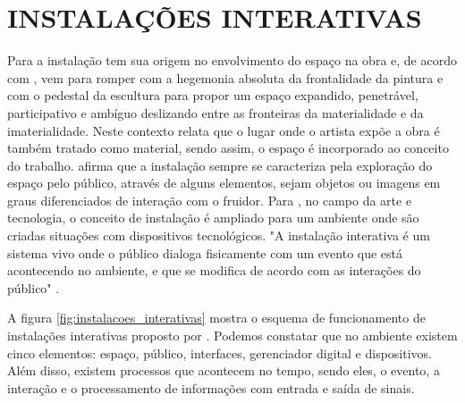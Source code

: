 \section{INSTALAÇÕES INTERATIVAS}
\label{sec:instalacoes_interativas}

Para  a instalação tem sua origem no envolvimento do espaço na obra e, de acordo com , vem para romper com a hegemonia absoluta da frontalidade da pintura e com o pedestal da escultura para propor um espaço expandido, penetrável, participativo e ambíguo deslizando entre as fronteiras da materialidade e da imaterialidade. Neste contexto  relata que o lugar onde o artista expõe a obra é também tratado como material, sendo assim, o espaço é incorporado ao conceito do trabalho.  afirma que a instalação sempre se caracteriza pela exploração do espaço pelo público, através de alguns elementos, sejam objetos ou imagens em graus diferenciados de interação com o fruidor. Para , no campo da arte e tecnologia, o conceito de instalação é ampliado para um ambiente onde são criadas situações com dispositivos tecnológicos. "A instalação interativa é um sistema vivo onde o público dialoga fisicamente com um evento que está acontecendo no ambiente, e que se modifica de acordo com as interações do público" \cite[p. 62]{sogabe2011}.


A figura \ref{fig:instalacoes_interativas} mostra o esquema de funcionamento de instalações interativas proposto por . Podemos constatar que no ambiente existem cinco elementos: espaço, público, interfaces, gerenciador digital e dispositivos. Além disso, existem processos que acontecem no tempo, sendo eles, o evento, a interação e o processamento de informações com entrada e saída de sinais. 

